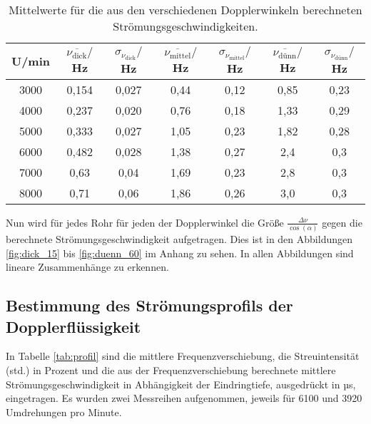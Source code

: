\begin{table}[htp]
	\begin{center}
    \caption{Mittelwerte für die aus den verschiedenen Dopplerwinkeln berechneten
    Strömungsgeschwindigkeiten.}
    \label{tab:mittelwerte}
		\begin{tabular}{ccccccc}
		\toprule
			{U/min} & {$\overline{\nu_{{\text{dick}}}}/$Hz} & {$\sigma_{{\nu_{\text{dick}}}}/$Hz} &
      {$\overline{\nu_{\text{mittel}}}/$Hz} & {$\sigma_{{\nu_{\text{mittel}}}}/$Hz} &
      {$\overline{\nu_{\text{dünn}}}/$Hz} & {$\sigma_{{\nu_{\text{dünn}}}}/$Hz}\\
			\midrule
			3000 & 0,154 & 0,027 & 0,44 & 0,12 & 0,85 & 0,23\\
			4000 & 0,237 & 0,020 & 0,76 & 0,18 & 1,33 & 0,29\\
			5000 & 0,333 & 0,027 & 1,05 & 0,23 & 1,82 & 0,28\\
			6000 & 0,482 & 0,028 & 1,38 & 0,27 & 2,4 & 0,3\\
			7000 & 0,63  & 0,04 & 1,69 & 0,23 & 2,8 & 0,3\\
			8000 & 0,71  & 0,06 & 1,86 & 0,26 & 3,0 & 0,3\\
		\bottomrule
		\end{tabular}
	\end{center}
\end{table}

Nun wird für jedes Rohr für jeden der Dopplerwinkel die Größe $\frac{\Delta \nu}{\cos(\alpha)}$
gegen die berechnete Strömungsgeschwindigkeit aufgetragen. Dies ist in den Abbildungen
\ref{fig:dick_15} bis \ref{fig:duenn_60} im Anhang zu sehen. In allen Abbildungen sind
lineare Zusammenhänge zu erkennen.

\subsection{Bestimmung des Strömungsprofils der Dopplerflüssigkeit}
\label{subsec:strömungsprofil}

In Tabelle \ref{tab:profil} sind die mittlere Frequenzverschiebung,
die Streuintensität (std.) in Prozent und die aus der Frequenzverschiebung
berechnete mittlere Strömungsgeschwindigkeit in Abhängigkeit der Eindringtiefe,
ausgedrückt in µs, eingetragen. Es wurden zwei Messreihen aufgenommen, jeweils für
6100 und 3920 Umdrehungen pro Minute.

